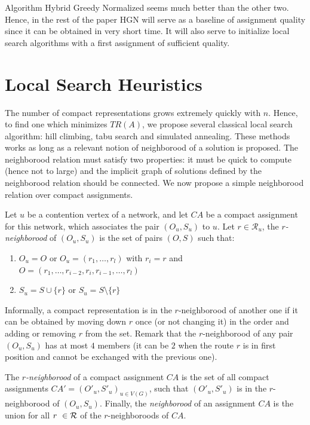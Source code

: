 \documentclass[english]{article}
\begin{document}
Algorithm Hybrid Greedy Normalized seems much better than the other two. Hence, in the rest of the paper HGN will serve 
as a baseline of assignment quality since it can be obtained in very short time. It will also serve to initialize 
local search algorithms with a first assignment of sufficient quality.

\section{Local Search Heuristics}

The number of compact representations grows extremely quickly with $n$. Hence, to find one which minimizes $TR(A)$, we propose several classical local search algorithm: hill climbing, tabu search and simulated annealing. These methods works as long as a relevant notion of neighborood of a solution is proposed. The neighborood relation must satisfy two properties: it must be quick to compute (hence not to large) and the implicit graph of solutions defined
by the neighborood relation should be connected. We now propose a simple neighborood relation over compact assignments.

Let $u$ be a contention vertex of a network, and let $CA$ be a compact assignment for this network, 
 which associates the pair $(O_u,S_u)$ to $u$. Let $r \in \mathcal{R}_u$, the \emph{$r$-neighborood} of $(O_u,S_u)$ is the set of pairs $(O,S)$ such that:
 
 \begin{enumerate} 
 \item $O_u = O$ or $O_u = (r_1,\dots,r_l)$ with $r_i = r$ and $O = (r_1,\dots,r_{i-2},r_{i},r_{i-1},\dots,r_{l})$ 
 \item $S_u = S \cup \{r\}$ or  $S_u = S \setminus \{r\}$ 
 \end{enumerate}

Informally, a compact representation is in the $r$-neighborood of another one if it can be obtained by 
moving down $r$ once (or not changing it) in the order and adding or removing $r$ from the set. 
Remark that the $r$-neighborood of any pair $(O_u,S_u)$ has at most $4$ members (it can be $2$ when the route $r$ is in first position and cannot be exchanged with the previous one). 

The \emph{$r$-neighborood} of a compact assignment $CA$ is the set of all compact assignments $CA'=(O'_u,S'_u)_{u \in V(G)}$, such that  $(O'_u,S'_u)$ is in the $r$-neighborood of $(O_u,S_u)$. Finally, the \emph{neighborood} of an assignment $CA$ is the union for all $r \in \cal{R}$ of the 
 $r$-neighboroods of $CA$.
\end{document}
